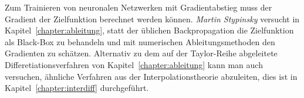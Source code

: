 Zum Trainieren von neuronalen Netzwerken mit Gradientabstieg muss 
der Gradient der Zielfunktion berechnet werden können.
{\em Martin Stypinsky} versucht in Kapitel~\ref{chapter:ableitung},
statt der üblichen Backpropagation
die Zielfunktion als Black-Box zu behandeln und mit numerischen
Ableitungsmethoden den Gradienten zu schätzen.
%
Alternativ zu dem auf der Taylor-Reihe abgeleitete Differetiationsverfahren
von Kapitel~\ref{chapter:ableitung} kann man auch versuchen, ähnliche
Verfahren aus der Interpolationstheorie abzuleiten, dies ist in
Kapitel~\ref{chapter:interdiff} durchgeführt.



